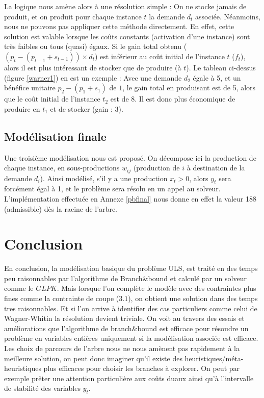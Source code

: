 \documentclass[a4paper,11pt,twoside]{report}
\begin{document}
La logique nous amène alors à une résolution simple : On ne stocke jamais de produit, et on produit pour chaque instance $t$ la demande $d_t$ associée. Néanmoins, nous ne pouvons pas appliquer cette méthode directement.
En effet, cette solution est valable lorsque les coûts constants (activation d'une instance) sont très faibles ou tous (quasi) égaux. Si le gain total obtenu ($(p_t-(p_{t-1}+s_{t-1}))\times d_t$) est inférieur au coût initial de l'instance $t$ ($f_t$), alors il est plus intéressant de stocker que de produire (à $t$).
Le tableau ci-dessus (figure \ref{warner1}) en est un exemple : Avec une demande $d_2$ égale à 5, et un bénéfice unitaire $p_2-(p_1+s_1)$ de $1$, le gain total en produisant est de 5, alors que le coût initial de l'instance $t_2$ est de 8. Il est donc plus économique de produire en $t_1$ et de stocker (gain : 3).

\section{Modélisation finale}
Une troisième modélisation nous est proposé. On décompose ici la production de chaque instance, en sous-productions $w_{ij}$ (production de $i$ à destination de la demande $d_i$).
Ainsi modélisé, s'il y a une production $x_t>0$, alors $y_t$ sera forcément égal à 1, et le problème sera résolu en un appel au solveur. L'implémentation effectuée en Annexe \ref{pbfinal} nous donne en effet la valeur 188 (admissible) dès la racine de l'arbre.

\chapter{Conclusion}
En conclusion, la modélisation basique du problème ULS, est traité en des temps peu raisonnables par l'algorithme de Branch\&bound et calculé par un solveur comme le $GLPK$. Mais lorsque l'on complète le modèle avec des contraintes plus fines comme la contrainte de coupe ($3.1$), on obtient une solution dans des temps tres raisonnables.
Et si l'on arrive à identifier des cas particuliers comme celui de Wagner-Whitin la résolution devient triviale.
On voit au travers des essais et améliorations que l'algorithme de branch\&bound est efficace pour résoudre un problème en variables entières uniquement si la modélisation associée est efficace.
Les choix de parcours de l'arbre nous ne nous amènent pas rapidement à la meilleure solution, on peut donc imaginer qu'il existe des heuristiques/méta-heuristiques plus efficaces pour choisir les branches à explorer.
On peut par exemple prêter une attention particulière aux coûts duaux ainsi qu'à l'intervalle de stabilité des variables $y_t$.
\end{document}
